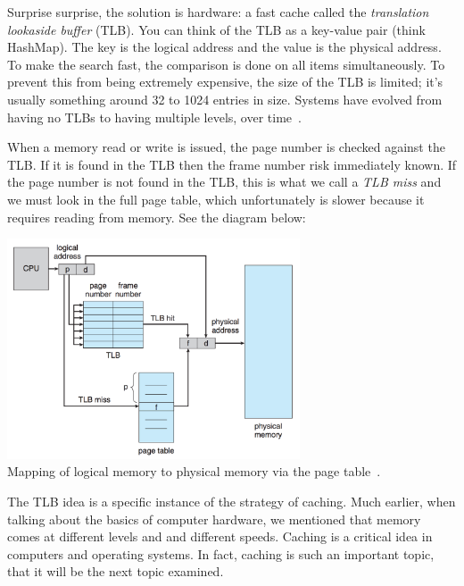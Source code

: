 Surprise surprise, the solution is hardware: a fast cache called the \textit{translation lookaside buffer} (TLB). You can think of the TLB as a key-value pair (think HashMap). The key is the logical address and the value is the physical address. To make the search fast, the comparison is done on all items simultaneously. To prevent this from being extremely expensive, the size of the TLB is limited; it's usually something around 32 to 1024 entries in size. Systems have evolved from having no TLBs to having multiple levels, over time~\cite{osc}.

When a memory read or write is issued, the page number is checked against the TLB. If it is found in the TLB then the frame number risk immediately known. If the page number is not found in the TLB, this is what we call a \textit{TLB miss} and we must look in the full page table, which unfortunately is slower because it requires reading from memory. See the diagram below:

\begin{center}
\includegraphics[width=0.65\textwidth]{images/tlb-hardware.png}\\
Mapping of logical memory to physical memory via the page table~\cite{osc}.
\end{center}

The TLB idea is a specific instance of the strategy of caching. Much earlier, when talking about the basics of computer hardware, we mentioned that memory comes at different levels and and different speeds. Caching is a critical idea in computers and operating systems. In fact, caching is such an important topic, that it will be the next topic examined.



